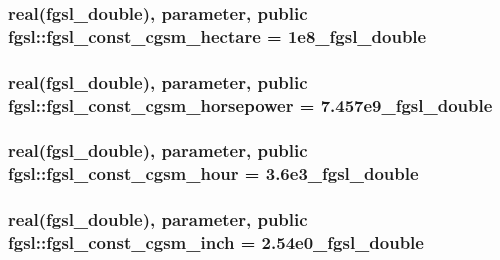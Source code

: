 \subsubsection[{fgsl\+\_\+const\+\_\+cgsm\+\_\+hectare}]{\setlength{\rightskip}{0pt plus 5cm}real({\bf fgsl\+\_\+double}), parameter, public fgsl\+::fgsl\+\_\+const\+\_\+cgsm\+\_\+hectare = 1e8\+\_\+fgsl\+\_\+double}\label{namespacefgsl_a4d19d597ffc77fc0c1aa577276cab117}
\hypertarget{namespacefgsl_a42cd4b78f557f4774c2542bb74f48dfb}{}
\subsubsection[{fgsl\+\_\+const\+\_\+cgsm\+\_\+horsepower}]{\setlength{\rightskip}{0pt plus 5cm}real({\bf fgsl\+\_\+double}), parameter, public fgsl\+::fgsl\+\_\+const\+\_\+cgsm\+\_\+horsepower = 7.\+457e9\+\_\+fgsl\+\_\+double}\label{namespacefgsl_a42cd4b78f557f4774c2542bb74f48dfb}
\hypertarget{namespacefgsl_ae4bb30ae02c03177a710c656125616a7}{}
\subsubsection[{fgsl\+\_\+const\+\_\+cgsm\+\_\+hour}]{\setlength{\rightskip}{0pt plus 5cm}real({\bf fgsl\+\_\+double}), parameter, public fgsl\+::fgsl\+\_\+const\+\_\+cgsm\+\_\+hour = 3.\+6e3\+\_\+fgsl\+\_\+double}\label{namespacefgsl_ae4bb30ae02c03177a710c656125616a7}
\hypertarget{namespacefgsl_ad425eda5fab2505e2342ed4f46b5f5f0}{}
\subsubsection[{fgsl\+\_\+const\+\_\+cgsm\+\_\+inch}]{\setlength{\rightskip}{0pt plus 5cm}real({\bf fgsl\+\_\+double}), parameter, public fgsl\+::fgsl\+\_\+const\+\_\+cgsm\+\_\+inch = 2.\+54e0\+\_\+fgsl\+\_\+double}\label{namespacefgsl_ad425eda5fab2505e2342ed4f46b5f5f0}
\hypertarget{namespacefgsl_a3cedc29e68dc7bfeb7a43c07d1496c6e}{}
